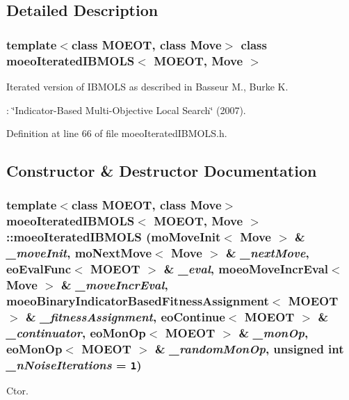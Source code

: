 \subsection{Detailed Description}
\subsubsection*{template$<$class MOEOT, class Move$>$ class moeo\-Iterated\-IBMOLS$<$ MOEOT, Move $>$}

Iterated version of IBMOLS as described in Basseur M., Burke K. 

: \char`\"{}Indicator-Based Multi-Objective Local Search\char`\"{} (2007). 



Definition at line 66 of file moeo\-Iterated\-IBMOLS.h.

\subsection{Constructor \& Destructor Documentation}
\subsubsection{\setlength{\rightskip}{0pt plus 5cm}template$<$class MOEOT, class Move$>$ \bf{moeo\-Iterated\-IBMOLS}$<$ MOEOT, Move $>$::\bf{moeo\-Iterated\-IBMOLS} (mo\-Move\-Init$<$ Move $>$ \& {\em \_\-move\-Init}, mo\-Next\-Move$<$ Move $>$ \& {\em \_\-next\-Move}, \bf{eo\-Eval\-Func}$<$ MOEOT $>$ \& {\em \_\-eval}, \bf{moeo\-Move\-Incr\-Eval}$<$ Move $>$ \& {\em \_\-move\-Incr\-Eval}, \bf{moeo\-Binary\-Indicator\-Based\-Fitness\-Assignment}$<$ MOEOT $>$ \& {\em \_\-fitness\-Assignment}, \bf{eo\-Continue}$<$ MOEOT $>$ \& {\em \_\-continuator}, \bf{eo\-Mon\-Op}$<$ MOEOT $>$ \& {\em \_\-mon\-Op}, \bf{eo\-Mon\-Op}$<$ MOEOT $>$ \& {\em \_\-random\-Mon\-Op}, unsigned int {\em \_\-n\-Noise\-Iterations} = {\tt 1})\hspace{0.3cm}{\tt  [inline]}}\label{classmoeoIteratedIBMOLS_67352bb5d797f20e767a4f0fa6d80f93}


Ctor. 

